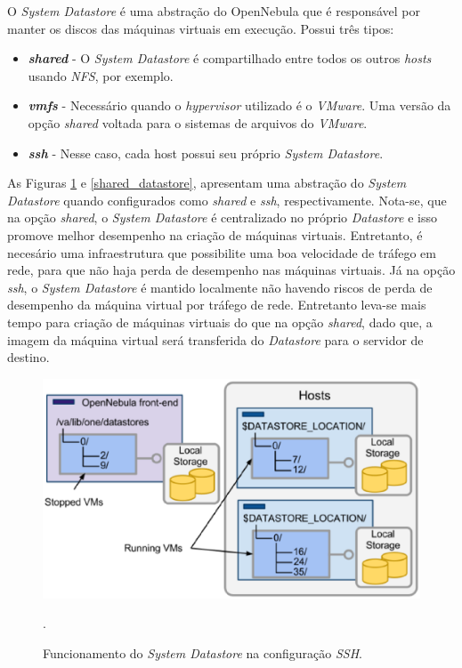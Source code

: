 O \textit{System Datastore} é uma abstração do OpenNebula que é responsável por manter os discos das máquinas virtuais em execução. Possui três tipos\cite{opennebula}:

\begin{itemize}
\item \textit{\textbf{shared}} - O \textit{System Datastore} é compartilhado entre todos os outros \textit{hosts} usando \textit{NFS}, por exemplo.
\item \textit{\textbf{vmfs}} - Necessário quando o \textit{hypervisor} utilizado é o \textit{VMware}. Uma versão da opção \textit{shared} voltada para o sistemas de arquivos do \textit{VMware}.
\item \textit{\textbf{ssh}} - Nesse caso, cada host possui seu próprio \textit{System Datastore}.
\end{itemize}

As Figuras \ref{ssh_datastore} e \ref{shared_datastore}, apresentam uma abstração do \textit{System Datastore} quando configurados como \textit{shared} e \textit{ssh}, respectivamente. Nota-se, que na opção \textit{shared}, o \textit{System Datastore} é centralizado no próprio \textit{Datastore} e isso promove melhor desempenho na criação de máquinas virtuais. Entretanto, é necesário uma infraestrutura que possibilite uma boa velocidade de tráfego em rede, para que não haja perda de desempenho nas máquinas virtuais. Já na opção \textit{ssh}, o \textit{System Datastore} é mantido localmente não havendo riscos de perda de desempenho da máquina virtual por tráfego de rede. Entretanto leva-se mais tempo para criação de máquinas virtuais do que na opção \textit{shared}, dado que, a imagem da máquina virtual será transferida do \textit{Datastore} para o servidor de destino.
\begin{figure}[!htb]
\centering
\includegraphics [keepaspectratio=true,scale=0.4]{figuras/ssh_datastore.eps}
\caption{Funcionamento do \textit{System Datastore} na configuração \textit{SSH}.}
\cite{opennebula}.
\label{ssh_datastore}
\end{figure}

